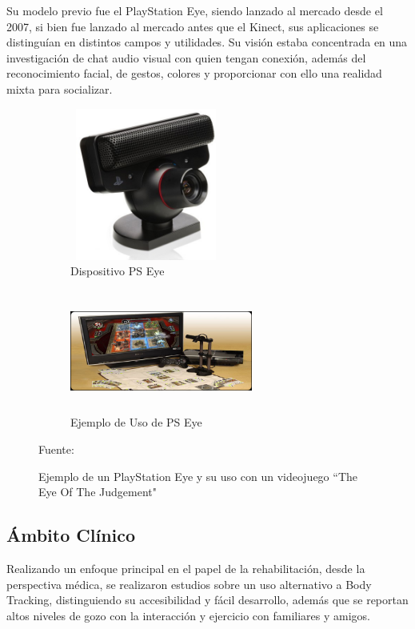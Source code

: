 Su modelo previo fue el PlayStation Eye, siendo lanzado al mercado desde el 2007, si bien fue lanzado al mercado antes que el Kinect, sus aplicaciones se distinguían en distintos campos y utilidades. Su visión estaba concentrada en una investigación de chat audio visual con quien tengan conexión, además del reconocimiento facial, de gestos, colores y proporcionar con ello una realidad mixta para socializar.
\begin{figure}
	\centering
	\begin{subfigure}{0.5\textwidth}
		\centering
		\includegraphics[width=5cm,height=5cm,]{./Images/eyeex.jpg}
		\caption{Dispositivo PS Eye}
		\label{eyeex}
	\end{subfigure}%
	\begin{subfigure}{0.5\textwidth}
		\centering
		\includegraphics[width=6cm,height=4cm,]{./Images/eyeexuse.jpg}
		\caption{Ejemplo de Uso de PS Eye}
		\label{eyeexuse}
	\end{subfigure}
	\caption{Ejemplo de un PlayStation Eye y su uso con un videojuego ``The Eye Of The Judgement"}
	\footnotesize Fuente: \cite{eyeex} \cite{eyeexuse}
	\label{eyeExample}
\end{figure}

\subsection{Ámbito Clínico}
Realizando un enfoque principal en el papel de la rehabilitación, desde la perspectiva médica, se realizaron estudios sobre un uso alternativo a Body Tracking, distinguiendo su accesibilidad y fácil desarrollo, además que se reportan altos niveles de gozo con la interacción y ejercicio con familiares y amigos. 

